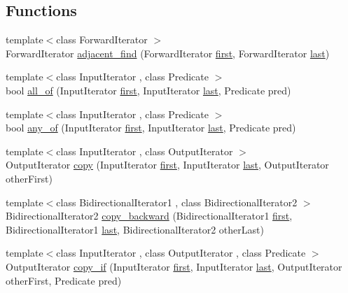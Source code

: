 \subsection*{Functions}
\begin{DoxyCompactItemize}
\item 
{\footnotesize template$<$class Forward\+Iterator $>$ }\\Forward\+Iterator \hyperlink{namespaceprism_a82052418345794a13044c15d8e32dd89}{adjacent\+\_\+find} (Forward\+Iterator \hyperlink{namespaceprism_ae3fb7a1926a9e8e59300cd5e370470da}{first}, Forward\+Iterator \hyperlink{namespaceprism_abe4956c4e865f55ca126b7fb973b5078}{last})
\item 
{\footnotesize template$<$class Input\+Iterator , class Predicate $>$ }\\bool \hyperlink{namespaceprism_aba366b328f3b6161e6115c16b7153c6d}{all\+\_\+of} (Input\+Iterator \hyperlink{namespaceprism_ae3fb7a1926a9e8e59300cd5e370470da}{first}, Input\+Iterator \hyperlink{namespaceprism_abe4956c4e865f55ca126b7fb973b5078}{last}, Predicate pred)
\item 
{\footnotesize template$<$class Input\+Iterator , class Predicate $>$ }\\bool \hyperlink{namespaceprism_a5d0e3ddb9f698759635572f1220ec0ca}{any\+\_\+of} (Input\+Iterator \hyperlink{namespaceprism_ae3fb7a1926a9e8e59300cd5e370470da}{first}, Input\+Iterator \hyperlink{namespaceprism_abe4956c4e865f55ca126b7fb973b5078}{last}, Predicate pred)
\item 
{\footnotesize template$<$class Input\+Iterator , class Output\+Iterator $>$ }\\Output\+Iterator \hyperlink{namespaceprism_ae776f4cd825f79e7af1cf6ee1d90a209}{copy} (Input\+Iterator \hyperlink{namespaceprism_ae3fb7a1926a9e8e59300cd5e370470da}{first}, Input\+Iterator \hyperlink{namespaceprism_abe4956c4e865f55ca126b7fb973b5078}{last}, Output\+Iterator other\+First)
\item 
{\footnotesize template$<$class Bidirectional\+Iterator1 , class Bidirectional\+Iterator2 $>$ }\\Bidirectional\+Iterator2 \hyperlink{namespaceprism_a2564c63b76369cc81ff725a56e818046}{copy\+\_\+backward} (Bidirectional\+Iterator1 \hyperlink{namespaceprism_ae3fb7a1926a9e8e59300cd5e370470da}{first}, Bidirectional\+Iterator1 \hyperlink{namespaceprism_abe4956c4e865f55ca126b7fb973b5078}{last}, Bidirectional\+Iterator2 other\+Last)
\item 
{\footnotesize template$<$class Input\+Iterator , class Output\+Iterator , class Predicate $>$ }\\Output\+Iterator \hyperlink{namespaceprism_afbed55ae6769c2d88c125aedc2f3846e}{copy\+\_\+if} (Input\+Iterator \hyperlink{namespaceprism_ae3fb7a1926a9e8e59300cd5e370470da}{first}, Input\+Iterator \hyperlink{namespaceprism_abe4956c4e865f55ca126b7fb973b5078}{last}, Output\+Iterator other\+First, Predicate pred)

\end{DoxyCompactItemize}
